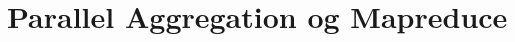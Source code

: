 \documentclass[../report.tex]{subfiles}
\begin{document}
\section{Parallel Aggregation og Mapreduce}
\end{document}
